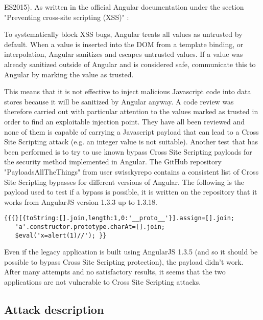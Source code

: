 \documentclass[a4paper,10pt]{memoir}
\begin{document}
ES2015). As written in the official Angular documentation under the section "Preventing cross-site scripting (XSS)" \cite{angular}:
\begin{quoting}[font=itshape, begintext={"}, endtext={"}]
To systematically block XSS bugs, Angular treats all values as untrusted by default. When a value is inserted into the DOM from a template binding, or interpolation, Angular sanitizes and escapes untrusted values. If a value was already sanitized outside of Angular and is considered safe, communicate this to Angular by marking the value as trusted.
\end{quoting}
This means that it is not effective to inject malicious Javascript code into data stores because it will be sanitized by Angular anyway. A code review was therefore carried out with particular attention to the values marked as trusted in order to find an exploitable injection point. They have all been reviewed and none of them is capable of carrying a Javascript payload that can lead to a Cross Site Scripting attack (e.g. an integer value is not suitable). Another test that has been performed is to try to use known bypass Cross Site Scripting payloads for the security method implemented in Angular. The GitHub repository "PayloadsAllTheThings" from user swisskyrepo contains a consistent list of Cross Site Scripting bypasses for different versions of Angular. The following is the payload used to test if a bypass is possible, it is written on the repository that it works from AngularJS version 1.3.3 up to 1.3.18.
\begin{lstlisting}
{{{}[{toString:[].join,length:1,0:'__proto__'}].assign=[].join;
   'a'.constructor.prototype.charAt=[].join;
   $eval('x=alert(1)//'); }}
\end{lstlisting}
Even if the legacy application is built using AngularJS 1.3.5 (and so it should be possible to bypass Cross Site Scripting protection), the payload didn't work. After many attempts and no satisfactory results, it seems that the two applications are not vulnerable to Cross Site Scripting attacks.


\subsection{Attack description}
\end{document}
